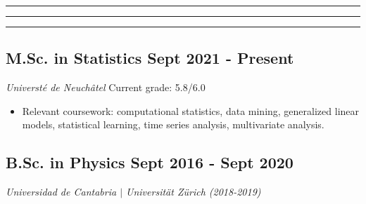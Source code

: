 \documentclass{resume}
\renewenvironment{rSection}[1]{
\sectionskip
\vspace{-3.5pt}
\color{NavyBlue}{\hspace{-3pt}\MakeUppercase{\Large{\textbf{#1}}}}
\vspace{3pt}
\color{NavyBlue}
\hrule
\hrule
\hrule
\color{black}
\begin{list}{}{
\setlength{\leftmargin}{1.5em}
}
\item[]
}{
\end{list}
}
\begin{document}
\begin{rSection}{Education}

\begin{adjustwidth}{-6mm}{0pt}
\vspace{-7pt}
\normalsize
\subsection*{M.Sc. in Statistics \normalfont \normalsize \hfill { Sept 2021 - Present}}
\vspace{-7pt}
\textit{\color{LightNavyBlue} Universté de Neuchâtel} %
\newline
Current grade: 5.8/6.0
\end{adjustwidth}

\begin{adjustwidth}{-9mm}{0pt}
\begin{itemize}
    \item \color{LightGrey} Relevant coursework: computational statistics, data mining, generalized linear models, statistical learning, time series analysis, multivariate analysis.
    
\end{itemize}
\end{adjustwidth}

\vspace{-12pt}
\vspace{-24pt}

\begin{adjustwidth}{-6mm}{0pt}
\vspace{-5pt}
\normalsize
\subsection*{B.Sc. in Physics \normalfont \normalsize \hfill { Sept 2016 - Sept 2020}}
\vspace{-7pt}
\textit{\color{LightNavyBlue} Universidad de Cantabria $|$ Universit{\"a}t Z{\"u}rich \color{LightGrey}(2018-2019)} %
\end{adjustwidth}


\end{rSection}
\end{document}
